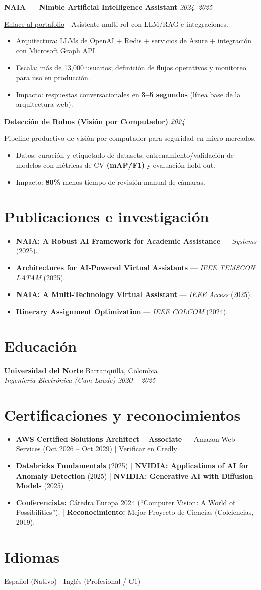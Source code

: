\documentclass[letterpaper,10pt]{article}
\newcommand{\resumeItem}[1]{\item \small{#1}}
\newcommand{\resumeSubheading}[4]{%
  \textbf{#1} \hfill #2 \\
  \textit{\small #3} \hfill \textit{\small #4} \\
  \vspace{-2pt}
}
\newcommand{\resumeProject}[3]{%
  \par\noindent\textbf{#1} \hfill \textit{\small #2} \par
  \noindent\small #3 \par
}
\newcommand{\projectGap}{\vspace{6pt}}
\begin{document}
\resumeProject
{NAIA --- Nimble Artificial Intelligence Assistant}{2024--2025}
{\href{https://www.adrianpabonmendoza.com/es/}{Enlace al portafolio} \;|\; Asistente multi-rol con LLM/RAG e integraciones.}
\begin{itemize}
  \resumeItem{Arquitectura: LLMs de OpenAI + Redis + servicios de Azure + integración con Microsoft Graph API.}
  \resumeItem{Escala: más de 13{,}000 usuarios; definición de flujos operativos y monitoreo para uso en producción.}
  \resumeItem{Impacto: respuestas conversacionales en \textbf{3--5 segundos} (línea base de la arquitectura web).}
\end{itemize}
\projectGap

\resumeProject
{Detección de Robos (Visión por Computador)}{2024}
{Pipeline productivo de visión por computador para seguridad en micro-mercados.}
\begin{itemize}
  \resumeItem{Datos: curación y etiquetado de datasets; entrenamiento/validación de modelos con métricas de CV \textbf{(mAP/F1)} y evaluación hold-out.}
  \resumeItem{Impacto: \textbf{80\%} menos tiempo de revisión manual de cámaras.}
\end{itemize}

\section{Publicaciones e investigación}
\begin{itemize}
  \resumeItem{\textbf{NAIA: A Robust AI Framework for Academic Assistance} --- \textit{Systems} (2025).}
  \resumeItem{\textbf{Architectures for AI-Powered Virtual Assistants} --- \textit{IEEE TEMSCON LATAM} (2025).}
  \resumeItem{\textbf{NAIA: A Multi-Technology Virtual Assistant} --- \textit{IEEE Access} (2025).}
  \resumeItem{\textbf{Itinerary Assignment Optimization} --- \textit{IEEE COLCOM} (2024).}
\end{itemize}

\section{Educación}
\resumeSubheading
{Universidad del Norte}{Barranquilla, Colombia}
{Ingeniería Electrónica (Cum Laude)}{2020 -- 2025}

\section{Certificaciones y reconocimientos}
\begin{itemize}
  \resumeItem{\textbf{AWS Certified Solutions Architect -- Associate} --- Amazon Web Services (Oct 2026 -- Oct 2029) \;|\; \href{https://www.credly.com/badges/c1b996bf-6ad3-4f0d-b936-1088787ad5c1/public_url}{Verificar en Credly}}
  \resumeItem{\textbf{Databricks Fundamentals} (2025) \;|\; \textbf{NVIDIA: Applications of AI for Anomaly Detection} (2025) \;|\; \textbf{NVIDIA: Generative AI with Diffusion Models} (2025)}
  \resumeItem{\textbf{Conferencista:} Cátedra Europa 2024 (``Computer Vision: A World of Possibilities''). \;|\; \textbf{Reconocimiento:} Mejor Proyecto de Ciencias (Colciencias, 2019).}
\end{itemize}

\section{Idiomas}
\small Español (Nativo) \;|\; Inglés (Profesional / C1)
\end{document}
